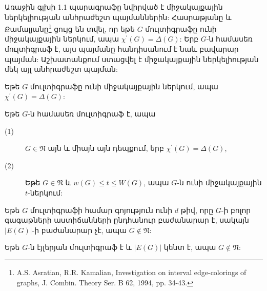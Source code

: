 Առաջին գլխի 1.1 պարագրաֆը նվիրված է միջակայքային ներկելիության անհրաժեշտ պայմաններին: Հասրաթյանը և Քամալյանը\footnote{A.S. Asratian, R.R. Kamalian, Investigation on interval edge-colorings of graphs, J. Combin. Theory Ser. B 62, 1994, pp. 34-43.} ցույց են տվել, որ եթե $G$ մուլտիգրաֆը ունի միջակայքային ներկում, ապա $\chi^{\prime}(G)=\Delta(G)$: Երբ $G$-ն համասեռ մուլտիգրաֆ է, այս պայմանը հանդիսանում է նաև բավարար պայման:  Աշխատանքում ստացվել է միջակայքային ներկելիության մեկ այլ անհրաժեշտ պայման:

\begin{hide}
\begin{theorem}
\label{t1_class1} Եթե $G$ մուլտիգրաֆը ունի միջակայքային ներկում, ապա $\chi^{\prime}(G)=\Delta(G)$:
\end{theorem}
\begin{theorem}
\label{t1_regular} Եթե $G$-ն համասեռ մուլտիգրաֆ է, ապա
\begin{description}
\item[(1)] $G\in \mathfrak{N}$ այն և միայն այն դեպքում, երբ $\chi^{\prime}(G)=\Delta(G)$,
\item[(2)] Եթե $G\in \mathfrak{N}$ և $w(G)\leq t\leq W(G)$, ապա $G$-ն ունի միջակայքային $t$-ներկում:
\end{description}
\end{theorem}
\end{hide}

\begin{theorem}
\label{t1_divisor} Եթե $G$ մուլտիգրաֆի համար գոյություն ունի $d$ թիվ, որը $G$-ի բոլոր գագաթների աստիճանների ընդհանուր բաժանարար է, սակայն $\vert E(G)\vert$-ի բաժանարար չէ, ապա $G\notin \mathfrak{N}$:
\end{theorem}
\begin{corollary}
\label{c1_eulerian} Եթե $G$-ն էյլերյան մուլտիգրաֆ է և $\vert
E(G)\vert$ կենտ է, ապա $G\notin \mathfrak{N}$:
\end{corollary}
